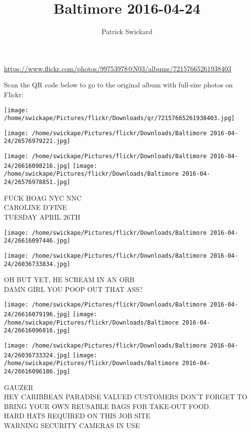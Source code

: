 \documentclass[10pt,letterpaper]{article}
\title{Baltimore 2016-04-24}
\author{Patrick Swickard}
\date{}
\begin{document}
\maketitle

\url{https://www.flickr.com/photos/99753978@N03/albums/72157665261938403}

Scan the QR code below to go to the original album with full-size photos on Flickr:

\texttt{[image: /home/swickape/Pictures/flickr/Downloads/qr/72157665261938403.jpg]}
\pagebreak

\texttt{[image: /home/swickape/Pictures/flickr/Downloads/Baltimore 2016-04-24/26576979221.jpg]}

\vspace{0.25in}
\texttt{[image: /home/swickape/Pictures/flickr/Downloads/Baltimore 2016-04-24/26616098216.jpg]}
\texttt{[image: /home/swickape/Pictures/flickr/Downloads/Baltimore 2016-04-24/26576978851.jpg]}

FUCK HOAG NYC NNC\\
CAROLINE D'FINE\\
TUESDAY APRIL 26TH
\pagebreak

\texttt{[image: /home/swickape/Pictures/flickr/Downloads/Baltimore 2016-04-24/26616097446.jpg]}

\vspace{0.25in}
\texttt{[image: /home/swickape/Pictures/flickr/Downloads/Baltimore 2016-04-24/26036733834.jpg]}

OH BUT YET, HE SCREAM IN AN ORB\\
DAMN GIRL YOU POOP OUT THAT ASS?
\pagebreak

\texttt{[image: /home/swickape/Pictures/flickr/Downloads/Baltimore 2016-04-24/26616079196.jpg]}
\texttt{[image: /home/swickape/Pictures/flickr/Downloads/Baltimore 2016-04-24/26616096816.jpg]}

\texttt{[image: /home/swickape/Pictures/flickr/Downloads/Baltimore 2016-04-24/26036733324.jpg]}
\texttt{[image: /home/swickape/Pictures/flickr/Downloads/Baltimore 2016-04-24/26616096186.jpg]}

GAUZER\\
HEY CARIBBEAN PARADISE VALUED CUSTOMERS DON'T FORGET TO BRING YOUR OWN REUSABLE BAGS FOR TAKE{-}OUT FOOD.\\
HARD HATS REQUIRED ON THIS JOB SITE\\
WARNING SECURITY CAMERAS IN USE
\pagebreak
\end{document}
